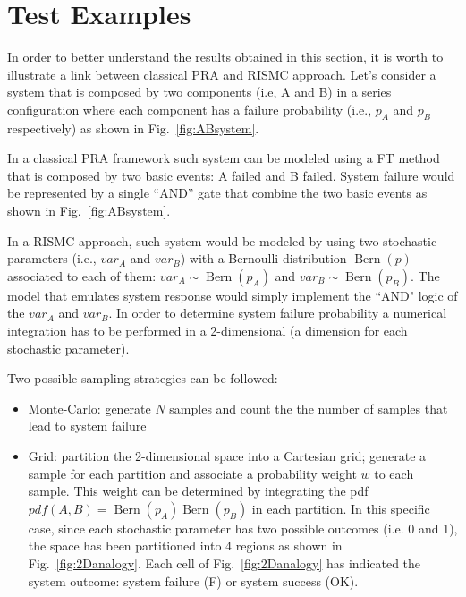 \section{Test Examples}
\label{sec:test}

In order to better understand the results obtained in this section, it is worth to illustrate 
a link between classical PRA and RISMC approach.
Let's consider a system that is composed by two components (i.e, A and B) in a series configuration where
each component has a failure probability (i.e., $p_A$ and $p_B$ respectively) as shown in Fig.~\ref{fig:ABsystem}.

In a classical PRA framework such system can be modeled using a FT method that is composed by two basic events:
A failed and B failed.
System failure would be represented by a single ``AND'' gate that combine the two basic events as shown in 
Fig.~\ref{fig:ABsystem}.

In a RISMC approach, such system would be modeled by using two stochastic parameters (i.e., $var_A$ and $var_B$)
with a Bernoulli distribution $\operatorname{Bern}(p)$ associated to each of them: 
$var_A \sim \operatorname{Bern}(p_A)$ and $var_B \sim \operatorname{Bern}(p_B)$. 
The model that emulates system response would simply implement the ``AND" logic of the $var_A$ and $var_B$. 
In order to determine system failure probability a numerical integration has to be performed in a 2-dimensional 
(a dimension for each stochastic parameter).

Two possible sampling strategies can be followed:
\begin{itemize}
  \item Monte-Carlo: generate $N$ samples and count the the number of samples that lead to system failure
  \item Grid: partition the 2-dimensional space into a Cartesian grid; generate a sample for each partition 
        and associate a probability weight $w$ to each sample. This weight can be determined by integrating the pdf
        $pdf(A,B) = \operatorname{Bern}(p_A) \operatorname{Bern}(p_B)$ in each partition. 
        In this specific case, since each stochastic parameter 
        has two possible outcomes (i.e. 0 and 1), the space has been partitioned into 4 regions as 
        shown in Fig.~\ref{fig:2Danalogy}. Each cell of Fig.~\ref{fig:2Danalogy} has indicated the system outcome:
        system failure (F) or system success (OK).
\end{itemize}

